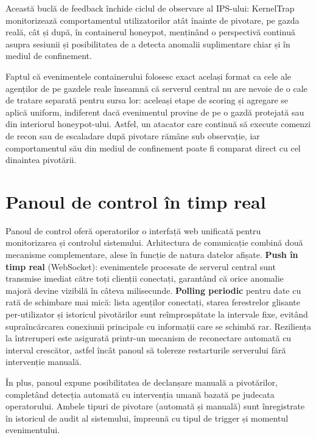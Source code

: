 Această buclă de feedback închide ciclul de observare al IPS-ului: KernelTrap monitorizează
comportamentul utilizatorilor atât înainte de pivotare, pe gazda reală, cât și după, în
containerul honeypot, menținând o perspectivă continuă asupra sesiunii și posibilitatea de a
detecta anomalii suplimentare chiar și în mediul de confinement.

Faptul că evenimentele containerului folosesc exact același format ca cele ale
agenților de pe gazdele reale înseamnă că serverul central nu are nevoie de o cale
de tratare separată pentru sursa lor: aceleași etape de scoring și agregare se
aplică uniform, indiferent dacă evenimentul provine de pe o gazdă protejată sau
din interiorul honeypot-ului. Astfel, un atacator care continuă să execute comenzi
de recon sau de escaladare după pivotare rămâne sub observație, iar comportamentul
său din mediul de confinement poate fi comparat direct cu cel dinaintea pivotării.

\section{Panoul de control în timp real}

Panoul de control oferă operatorilor o interfață web unificată pentru
monitorizarea și controlul sistemului. Arhitectura de comunicație combină două mecanisme
complementare, alese în funcție de natura datelor afișate. \textbf{Push în timp real}
(WebSocket): evenimentele procesate de serverul central sunt transmise imediat către toți
clienții conectați, garantând că orice anomalie majoră devine vizibilă în câteva
milisecunde. \textbf{Polling periodic} pentru date cu rată de schimbare mai mică: lista
agenților conectați, starea ferestrelor glisante per-utilizator și istoricul pivotărilor
sunt reîmprospătate la intervale fixe, evitând supraîncărcarea conexiunii principale cu
informații care se schimbă rar. Reziliența la întreruperi este asigurată printr-un mecanism
de reconectare automată cu interval crescător, astfel încât panoul să tolereze restarturile
serverului fără intervenție manuală.

În plus, panoul expune posibilitatea de declanșare manuală a pivotărilor, completând
detecția automată cu intervenția umană bazată pe judecata operatorului. Ambele tipuri de
pivotare (automată și manuală) sunt înregistrate în istoricul de audit al sistemului,
împreună cu tipul de trigger și momentul evenimentului.
